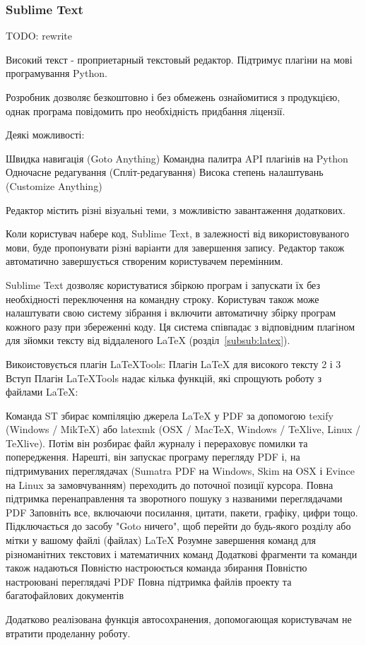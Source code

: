 \subsubsection{Sublime Text}

TODO: rewrite

Високий текст - проприетарный текстовый редактор. Підтримує плагіни на мові програмування Python.

Розробник дозволяє безкоштовно і без обмежень ознайомитися з продукцією, однак програма повідомить про необхідність придбання ліцензії.

Деякі можливості:

Швидка навигація (Goto Anything)
Командна палитра
API плагінів на Python
Одночасне редагування (Спліт-редагування)
Висока степень налаштувань (Customize Anything)

Редактор містить різні візуальні теми, з можливістю завантаження додаткових.

Коли користувач набере код, Sublime Text, в залежності від використовуваного мови, буде пропонувати різні варіанти для завершення запису. Редактор також автоматично завершується створеним користувачем перемінним.

Sublime Text дозволяє користуватися збіркою програм і запускати їх без необхідності переключення на командну строку. Користувач також може налаштувати свою систему зібрання і включити автоматичну збірку програм кожного разу при збереженні коду. Ця система співпадає з відповідним плагіном для зйомки тексту від віддаленого LaTeX (розділ~\ref{subsub:latex}).

Викоистовується плагін LaTeXTools: Плагін LaTeX для високого тексту 2 і 3
Вступ
Плагін LaTeXTools надає кілька функцій, які спрощують роботу з файлами LaTeX:

Команда ST збирає компіляцію джерела LaTeX у PDF за допомогою texify (Windows / MikTeX) або latexmk (OSX / MacTeX, Windows / TeXlive, Linux / TeXlive). Потім він розбирає файл журналу і перераховує помилки та попередження. Нарешті, він запускає програму перегляду PDF і, на підтримуваних переглядачах (Sumatra PDF на Windows, Skim на OSX і Evince на Linux за замовчуванням) переходить до поточної позиції курсора.
Повна підтримка перенаправлення та зворотного пошуку з названими переглядачами PDF
Заповніть все, включаючи посилання, цитати, пакети, графіку, цифри тощо.
Підключається до засобу "Goto ничего", щоб перейти до будь-якого розділу або мітки у вашому файлі (файлах) LaTeX
Розумне завершення команд для різноманітних текстових і математичних команд
Додаткові фрагменти та команди також надаються
Повністю настроюється команда збирання
Повністю настроювані переглядачі PDF
Повна підтримка файлів проекту та багатофайлових документів

Додатково реалізована функція автосохранения, допомогающая користувачам не втратити проделанну роботу.
